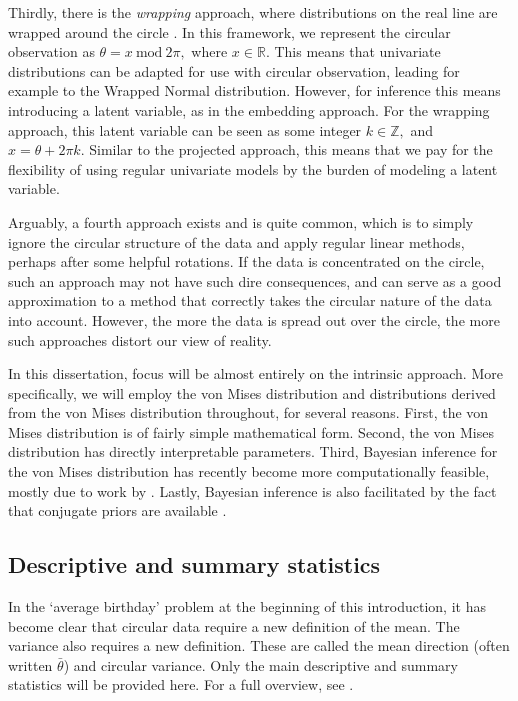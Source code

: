 \documentclass[12pt, a4paper]{book}\usepackage[]{graphicx}\usepackage{xcolor}
\begin{document}
Thirdly, there is the \textit{wrapping} approach, where distributions on the real line are wrapped around the circle \citep{ferrari2009wrapping}. In this framework,  we represent the circular observation as $\theta = x ~\text{mod} ~ 2\pi,$ where \(x \in \mathbb{R}\). This means that univariate distributions can be adapted for use with circular observation, leading for example to the Wrapped Normal distribution. However, for inference this means introducing a latent variable, as in the embedding approach. For the wrapping approach, this latent variable can be seen as some integer $k \in \mathbb{Z},$ and $x = \theta + 2\pi k.$ Similar to the projected approach, this means that we pay for the flexibility of using regular univariate models by the burden of modeling a latent variable.

Arguably, a fourth approach exists and is quite common, which is to simply ignore the circular structure of the data and apply regular linear methods, perhaps after some helpful rotations. If the data is concentrated on the circle, such an approach may not have such dire consequences, and can serve as a good approximation to a method that correctly takes the circular nature of the data into account. However, the more the data is spread out over the circle, the more such approaches distort our view of reality.

In this dissertation, focus will be almost entirely on the intrinsic approach. More specifically, we will employ the von Mises distribution and distributions derived from the von Mises distribution throughout, for several reasons. First, the von Mises distribution is of fairly simple mathematical form. Second, the von Mises distribution has directly interpretable parameters. Third, Bayesian inference for the von Mises distribution has recently become more computationally feasible, mostly due to work by \citet{forbes2015fast}. Lastly, Bayesian inference is also facilitated by the fact that conjugate priors are available \citep{mardia1976bayesian}.


\subsection*{Descriptive and summary statistics}


In the `average birthday' problem at the beginning of this introduction, it has become clear that circular data require a new definition of the mean. The variance also requires a new definition. These are called the mean direction (often written $\bar{\theta}$) and circular variance. Only the main descriptive and summary statistics will be provided here. For a full overview, see  \citet{mardia2009directional}.
\end{document}
